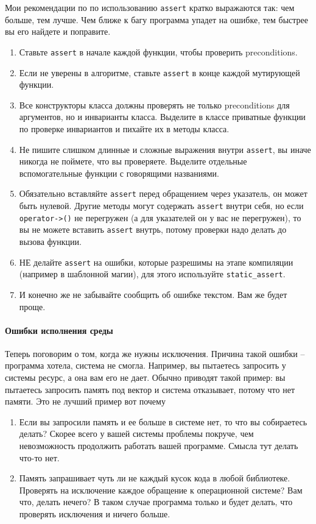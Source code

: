 \documentclass{article}
\begin{document}
Мои рекомендации по по использованию \verb"assert" кратко выражаются так: чем больше, тем лучше. Чем ближе к багу программа упадет на ошибке, тем быстрее вы его найдете и поправите.
\begin{enumerate}
\item  Ставьте \verb"assert" в начале каждой функции, чтобы проверить preconditions.

\item Если не уверены в алгоритме, ставьте \verb"assert" в конце каждой мутирующей функции.

\item Все конструкторы класса должны проверять не только preconditions для аргументов, но и инварианты класса. Выделите в классе приватные функции по проверке инвариантов и пихайте их в методы класса.

\item Не пишите слишком длинные и сложные выражения внутри \verb"assert", вы иначе никогда не поймете, что вы проверяете. Выделите отдельные вспомогательные функции с говорящими названиями.

\item Обязательно вставляйте \verb"assert" перед обращением через указатель, он может быть нулевой. Другие методы могут содержать \verb"assert" внутри себя, но если \verb"operator->()" не перегружен (а для указателей он у вас не перегружен), то вы не можете вставить \verb"assert" внутрь, потому проверки надо делать до вызова функции.

\item НЕ делайте \verb"assert" на ошибки, которые разрешимы на этапе компиляции (например в шаблонной магии), для этого используйте \verb"static_assert".

\item И конечно же не забывайте сообщить об ошибке текстом. Вам же будет проще.
\end{enumerate}



\paragraph{Ошибки исполнения среды}
Теперь поговорим о том, когда же нужны исключения. Причина такой ошибки -- программа хотела, система не смогла. Например, вы пытаетесь запросить у системы ресурс, а она вам его не дает. Обычно приводят такой пример: вы пытаетесь запросить память под вектор и система отказывает, потому что нет памяти. Это не лучший пример вот почему
\begin{enumerate}
\item Если вы запросили память и ее больше в системе нет, то что вы собираетесь делать? Скорее всего у вашей системы проблемы покруче, чем невозможность продолжить работать вашей программе. Смысла тут делать что-то нет.

\item Память запрашивает чуть ли не каждый кусок кода в любой библиотеке. Проверять на исключение каждое обращение к операционной системе? Вам что, делать нечего? В таком случае программа только и будет делать, что проверять исключения и ничего больше.
\end{enumerate}
\end{document}
